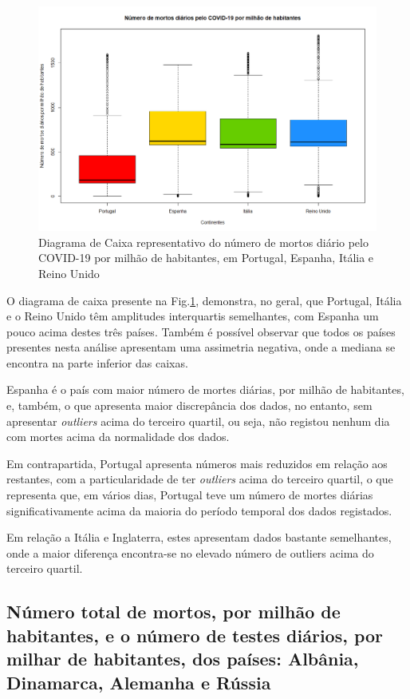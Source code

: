 \documentclass[conference]{IEEEtran}
\begin{document}
\begin{figure}[htbp]
\centerline{\includegraphics[width=0.95\columnwidth]{images/01.c.png}}
\caption{Diagrama de Caixa representativo do número de mortos diário pelo COVID-19 por milhão de habitantes, em Portugal, Espanha, Itália e Reino Unido}
\label{1c}
\end{figure}

O diagrama de caixa presente na Fig.\ref{1c}, demonstra, no geral, que Portugal, Itália e o Reino Unido têm amplitudes interquartis semelhantes, com Espanha um pouco acima destes três países. Também é possível observar que todos os países presentes nesta análise apresentam uma assimetria negativa, onde a mediana se encontra na parte inferior das caixas.

Espanha é o país com maior número de mortes diárias, por milhão de habitantes, e, também, o que apresenta maior discrepância dos dados, no entanto, sem apresentar \textit{outliers} acima do terceiro quartil, ou seja, não registou nenhum dia com mortes acima da normalidade dos dados.

Em contrapartida, Portugal apresenta números mais reduzidos em relação aos restantes, com a particularidade de ter \textit{outliers} acima do terceiro quartil, o que representa que, em vários dias, Portugal teve um número de mortes diárias significativamente acima da maioria do período temporal dos dados registados.

Em relação a Itália e Inglaterra, estes apresentam dados bastante semelhantes, onde a maior diferença encontra-se no elevado número de outliers acima do terceiro quartil.


\subsection{Número total de mortos, por milhão de habitantes, e o número de testes diários, por milhar de habitantes, dos países: Albânia, Dinamarca, Alemanha e Rússia}
\end{document}
